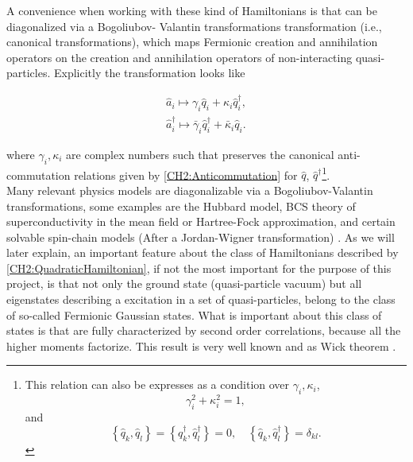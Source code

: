 A convenience when working with these kind of Hamiltonians is that can be diagonalized via a Bogoliubov- Valantin transformations transformation (i.e., canonical transformations), which maps Fermionic creation and annihilation operators on the creation and annihilation operators of non-interacting quasi-particles\cite{berezin_method_1966,bogoljubov_new_1958}. Explicitly the transformation looks like

\begin{equation}
\begin{array}{c}
\hat{a}_{i} \mapsto \gamma_{i} \hat{q}_{i}+\kappa_{i} \hat{q}_{i}^{\dagger}, \\
\hat{a}_{i}^{\dagger} \mapsto \bar{\gamma}_{i} \hat{q}_{i}^{\dagger}+\bar{\kappa}_{i} \hat{q}_{i}.
\end{array}
\label{CH2:Bogoliuvov}
\end{equation}

where $\gamma_i , \kappa_i$ are complex numbers such that preserves the canonical anti-commutation relations given by \eqref{CH2:Anticommutation} for $\hat{q}$, $\hat{q}^{\dagger}$\footnote{This relation can also be expresses as a condition over $\gamma_i , \kappa_i$,
\[ \gamma_i ^2+ \kappa_i^2 = 1,\]
and 
\[\left\{\hat{q}_{k}, \hat{q}_{l}\right\}=\left\{\hat{q}_{k}^{\dagger}, \hat{q}_{l}^{\dagger}\right\}=0, \quad\left\{\hat{q}_{k}, \hat{q}_{l}^{\dagger}\right\}=\delta_{k l}.\]
 }.
\\
Many relevant physics models are diagonalizable via a Bogoliubov-Valantin transformations, some examples are the Hubbard model, BCS theory of superconductivity in the mean field or Hartree-Fock approximation, and certain solvable spin-chain models (After a Jordan-Wigner transformation) \cite{fradkin_field_1997}. As we will later explain, an important feature about the class of Hamiltonians described by \eqref{CH2:QuadraticHamiltonian}, if not the most important for the purpose of this project,  is that not only the ground state (quasi-particle vacuum)  but all eigenstates describing a excitation  in a set of quasi-particles, belong to the class of so-called Fermionic Gaussian states\cite{botero_bcs-like_2004}. What is important about this class of states is that are fully characterized by second order correlations, because all the higher moments factorize. This result is very well known and as Wick theorem \cite{westwanski_general_1973,molinari_notes_2017}.
